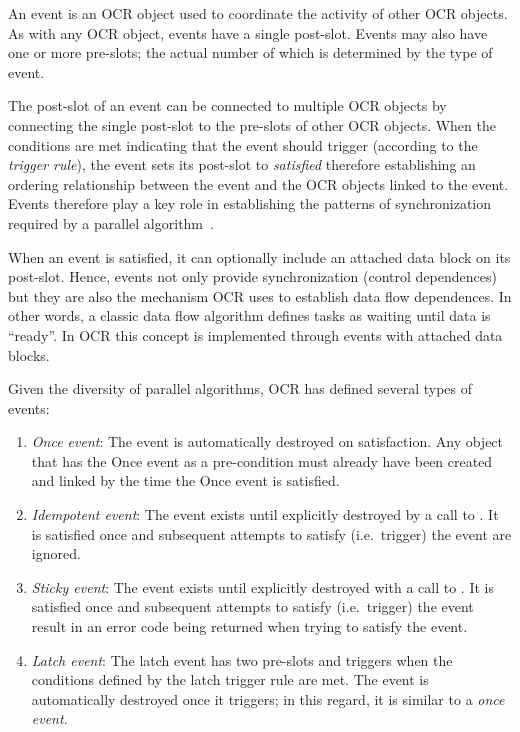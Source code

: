 An event is an OCR object used to coordinate the activity of other OCR
objects. As with any OCR object, events have a single
post-slot. Events may also have one or more pre-slots; the actual
number of which is determined by the type of event.

The post-slot of an event can be connected to multiple OCR objects by
connecting the single post-slot to the pre-slots of other OCR objects.
When the conditions are met indicating that the event should trigger
(according to the \emph{trigger rule}), the event
sets its post-slot to \emph{satisfied} therefore establishing an
ordering relationship between the event and the OCR objects linked to
the event. Events therefore play a key role in establishing the
patterns of synchronization required by a parallel
algorithm~\cite{ImSa14-2}.

When an event is satisfied, it can optionally include an attached
data block on its post-slot. Hence, events not only provide synchronization
(control dependences) but they are also the mechanism OCR uses to
establish data flow dependences. In other words, a classic data flow
algorithm defines tasks as waiting until data is ``ready''. In OCR
this concept is implemented through events with attached data blocks.

Given the diversity of parallel algorithms, OCR has defined several
types of events:
\begin{enumerate}
\item \emph{Once event}: The event is automatically
destroyed on satisfaction. Any object that has the Once event as a
pre-condition must already have been created and linked by the time
the Once event is satisfied.

\item \emph{Idempotent event}: The event
exists until explicitly destroyed by a call to
. It is satisfied once and subsequent attempts
to satisfy (i.e.\ trigger) the event are ignored.

\item \emph{Sticky event}: The event exists until
explicitly destroyed with a call to . It is
satisfied once and subsequent attempts to satisfy (i.e.\ trigger) the
event result in an error code being returned when trying to satisfy
the event.
\item \emph{Latch event}: The latch event has two
pre-slots and triggers when the conditions defined by the latch
trigger rule are met. The event is automatically destroyed once it
triggers; in this regard, it is similar to a \emph{once event}.
\end{enumerate}

